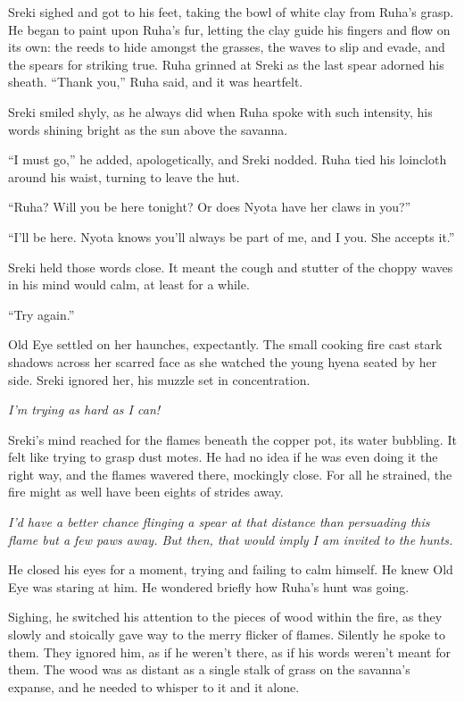 Sreki sighed and got to his feet, taking the bowl of white clay from Ruha's grasp. He began to paint upon Ruha's fur, letting the clay guide his fingers and flow on its own: the reeds to hide amongst the grasses, the waves to slip and evade, and the spears for striking true. Ruha grinned at Sreki as the last spear adorned his sheath. ``Thank you,'' Ruha said, and it was heartfelt.

Sreki smiled shyly, as he always did when Ruha spoke with such intensity, his words shining bright as the sun above the savanna.

``I must go,'' he added, apologetically, and Sreki nodded. Ruha tied his loincloth around his waist, turning to leave the hut.

``Ruha? Will you be here tonight? Or does Nyota have her claws in you?''

``I'll be here. Nyota knows you'll always be part of me, and I you. She accepts it.''

Sreki held those words close. It meant the cough and stutter of the choppy waves in his mind would calm, at least for a while.

\secdiv

\noindent ``Try again.''

Old Eye settled on her haunches, expectantly. The small cooking fire cast stark shadows across her scarred face as she watched the young hyena seated by her side. Sreki ignored her, his muzzle set in concentration.

\emph{I'm trying as hard as I can!}

Sreki's mind reached for the flames beneath the copper pot, its water bubbling. It felt like trying to grasp dust motes. He had no idea if he was even doing it the right way, and the flames wavered there, mockingly close. For all he strained, the fire might as well have been eights of strides away.

\emph{I'd have a better chance flinging a spear at that distance than persuading this flame but a few paws away. But then, that would imply I am invited to the hunts.}

He closed his eyes for a moment, trying and failing to calm himself. He knew Old Eye was staring at him. He wondered briefly how Ruha's hunt was going.

Sighing, he switched his attention to the pieces of wood within the fire, as they slowly and stoically gave way to the merry flicker of flames. Silently he spoke to them. They ignored him, as if he weren't there, as if his words weren't meant for them. The wood was as distant as a single stalk of grass on the savanna's expanse, and he needed to whisper to it and it alone.

